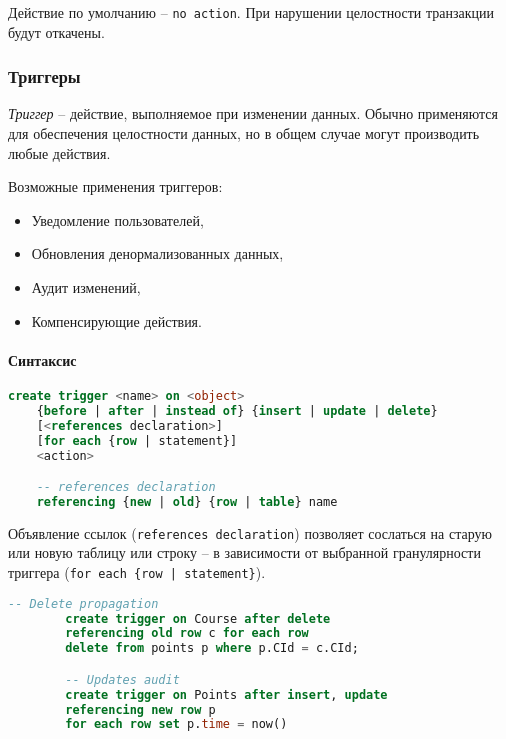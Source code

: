 \begin{remark}
	Действие по умолчанию -- \texttt{no action}. При нарушении целостности транзакции будут
	откачены.
\end{remark}

\subsubsection{Триггеры}

\begin{definition}
	\textit{Триггер} -- действие, выполняемое при изменении данных. Обычно применяются для
	обеспечения целостности данных, но в общем случае могут производить любые действия.
\end{definition}

Возможные применения триггеров:

\begin{itemize}
	\item Уведомление пользователей,
	\item Обновления денормализованных данных,
	\item Аудит изменений,
	\item Компенсирующие действия.
\end{itemize}

\paragraph{Синтаксис}
\enewline

\begin{lstlisting}[language=SQL]
    create trigger <name> on <object>
    {before | after | instead of} {insert | update | delete}
    [<references declaration>]
    [for each {row | statement}]
    <action>

    -- references declaration
    referencing {new | old} {row | table} name
\end{lstlisting}

Объявление ссылок (\texttt{references declaration}) позволяет сослаться на старую или новую таблицу или
строку -- в зависимости от выбранной гранулярности триггера (\texttt{for each \{row | statement\}}).

\begin{examples}
	\enewline
	\begin{lstlisting}[language=SQL]
        -- Delete propagation
        create trigger on Course after delete
        referencing old row c for each row
        delete from points p where p.CId = c.CId;

        -- Updates audit
        create trigger on Points after insert, update
        referencing new row p
        for each row set p.time = now()
    \end{lstlisting}
\end{examples}
